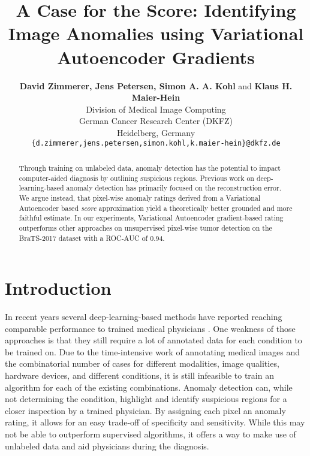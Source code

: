 \documentclass{article}
\title{A Case for the Score: Identifying Image Anomalies using Variational Autoencoder Gradients}
\author{
  \textbf{David Zimmerer, Jens Petersen, Simon A. A. Kohl} and \textbf{Klaus H. Maier-Hein} \\
  Division of Medical Image Computing\\
  German Cancer Research Center (DKFZ)\\
  Heidelberg, Germany \\
  \texttt{\{d.zimmerer,jens.petersen,simon.kohl,k.maier-hein\}@dkfz.de}
}
\begin{document}
\maketitle

\begin{abstract}
  Through training on unlabeled data, anomaly detection has the potential to impact computer-aided diagnosis by outlining suspicious regions. 
  Previous work on deep-learning-based anomaly detection has primarily focused on the reconstruction error. We argue instead, that pixel-wise anomaly ratings derived from a Variational Autoencoder based \textit{score} approximation yield a theoretically better grounded and more faithful estimate.
  In our experiments, Variational Autoencoder gradient-based rating outperforms other approaches on unsupervised pixel-wise tumor detection on the BraTS-2017 dataset with a ROC-AUC of 0.94.
\end{abstract}

\section{Introduction}

In recent years several deep-learning-based methods have reported reaching comparable performance to trained medical physicians \cite{liu_detecting_2017,gulshan_development_2106}.  
One weakness of those approaches is that they still require a lot of annotated data for each condition to be trained on.
Due to the time-intensive work of annotating medical images and the combinatorial number of cases for different modalities, image qualities, hardware devices, and different conditions, it is still infeasible to train an algorithm for each of the existing combinations.
Anomaly detection can, while not determining the condition, highlight and identify suspicious regions for a closer inspection by a trained physician.
By assigning each pixel an anomaly rating, it allows for an easy trade-off of specificity and sensitivity. 
While this may not be able to outperform supervised algorithms, it offers a way to make use of unlabeled data and aid physicians during the diagnosis.
\end{document}
